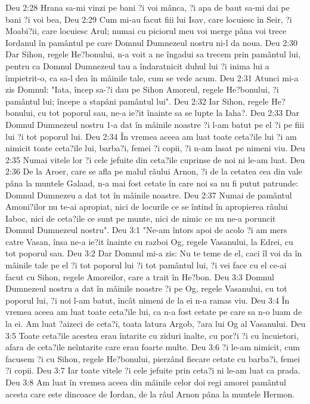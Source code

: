 Deu 2:28  Hrana sa-mi vinzi pe bani ?i voi mânca, ?i apa de baut sa-mi dai pe bani ?i voi bea,
Deu 2:29  Cum mi-au facut fiii lui Isav, care locuiesc în Seir, ?i Moabi?ii, care locuiesc Arul; numai cu piciorul meu voi merge pâna voi trece Iordanul în pamântul pe care Domnul Dumnezeul nostru ni-l da noua.
Deu 2:30  Dar Sihon, regele He?bonului, n-a voit a ne îngadui sa trecem prin pamântul lui, pentru ca Domnul Dumnezeul tau a îndaratnicit duhul lui ?i inima lui a împietrit-o, ca sa-l dea în mâinile tale, cum se vede acum.
Deu 2:31  Atunci mi-a zis Domnul: "Iata, încep sa-?i dau pe Sihon Amoreul, regele He?bonului, ?i pamântul lui; începe a stapâni pamântul lui".
Deu 2:32  Iar Sihon, regele He?bonului, cu tot poporul sau, ne-a ie?it înainte sa se lupte la Iaha?.
Deu 2:33  Dar Domnul Dumnezeul nostru 1-a dat în mâinile noastre ?i l-am batut pe el ?i pe fiii lui ?i tot poporul lui.
Deu 2:34  În vremea aceea am luat toate ceta?ile lui ?i am nimicit toate ceta?ile lui, barba?i, femei ?i copii, ?i n-am lasat pe nimeni viu.
Deu 2:35  Numai vitele lor ?i cele jefuite din ceta?ile cuprinse de noi ni le-am luat.
Deu 2:36  De la Aroer, care se afla pe malul râului Arnon, ?i de la cetatea cea din vale pâna la muntele Galaad, n-a mai fost cetate în care noi sa nu fi putut patrunde: Domnul Dumnezeu a dat tot în mâinile noastre.
Deu 2:37  Numai de pamântul Amoni?ilor nu te-ai apropiat, nici de locurile ce se întind în apropierea râului Iaboc, nici de ceta?ile ce sunt pe munte, nici de nimic ce nu ne-a poruncit Domnul Dumnezeul nostru".
Deu 3:1  "Ne-am întors apoi de acolo ?i am mers catre Vasan, însa ne-a ie?it înainte cu razboi Og, regele Vasanului, la Edrei, cu tot poporul sau.
Deu 3:2  Dar Domnul mi-a zis: Nu te teme de el, caci îl voi da în mâinile tale pe el ?i tot poporul lui ?i tot pamântul lui, ?i vei face cu el ce-ai facut cu Sihon, regele Amoreilor, care a trait în He?bon.
Deu 3:3  Domnul Dumnezeul nostru a dat în mâinile noastre ?i pe Og, regele Vasanului, cu tot poporul lui, ?i noi l-am batut, încât nimeni de la ei n-a ramas viu.
Deu 3:4  În vremea aceea am luat toate ceta?ile lui, ca n-a fost cetate pe care sa n-o luam de la ei. Am luat ?aizeci de ceta?i, toata latura Argob, ?ara lui Og al Vasanului.
Deu 3:5  Toate ceta?ile acestea erau întarite cu ziduri înalte, cu por?i ?i cu încuietori, afara de ceta?ile neîntarite care erau foarte multe.
Deu 3:6  ?i le-am nimicit, cum facusem ?i cu Sihon, regele He?bonului, pierzând fiecare cetate cu barba?i, femei ?i copii.
Deu 3:7  Iar toate vitele ?i cele jefuite prin ceta?i ni le-am luat ca prada.
Deu 3:8  Am luat în vremea aceea din mâinile celor doi regi amorei pamântul acesta care este dincoace de Iordan, de la râul Arnon pâna la muntele Hermon.
